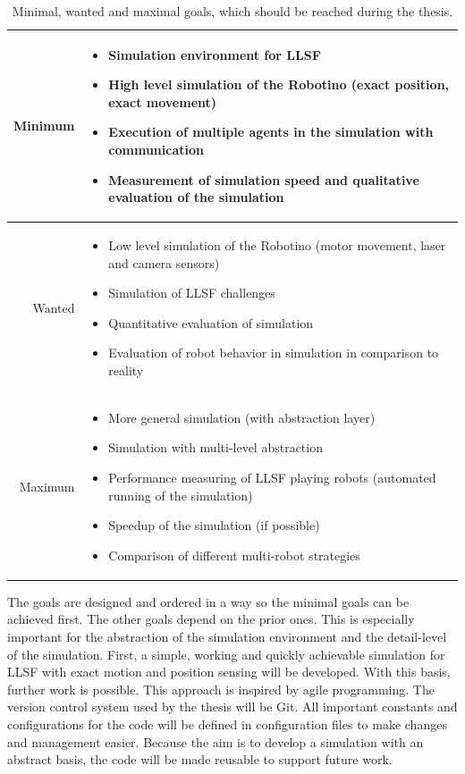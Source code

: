 \documentclass[11pt,a4paper,titlepage]{article}
\begin{document}
\begin{table}
\begin{tabular}{|r||p{10cm}|}
\hline
Minimum & \begin{itemize}
\item Simulation environment for LLSF
\item High level simulation of the Robotino (exact position, exact movement)
\item Execution of multiple agents in the simulation with communication
\item Measurement of simulation speed and qualitative evaluation of the simulation
\end{itemize}\\ \hline
Wanted & \begin{itemize}
\item Low level simulation of the Robotino (motor movement, laser and camera sensors)
\item Simulation of LLSF challenges
\item Quantitative evaluation of simulation
\item Evaluation of robot behavior in simulation in comparison to reality
\end{itemize}\\ \hline
Maximum & \begin{itemize}
\item More general simulation (with abstraction layer)
\item Simulation with multi-level abstraction
\item Performance measuring of LLSF playing robots (automated running of the simulation)
\item Speedup of the simulation (if possible)
\item Comparison of different multi-robot strategies
\end{itemize}\\
\hline
\end{tabular}
\label{Table 1}
\caption{Minimal, wanted and maximal goals, which should be reached during the thesis.}
\end{table}
The goals are designed and ordered in a way so the minimal goals can be achieved first. The other goals depend on the prior ones. This is especially important for the abstraction of the simulation environment and the detail-level of the simulation. First, a simple, working and quickly achievable simulation for LLSF with exact motion and position sensing will be developed. With this basis, further work is possible. This approach is inspired by agile programming. The version control system used by the thesis will be Git. All important constants and configurations for the code will be defined in configuration files to make changes and management easier. Because the aim is to develop a simulation with an abstract basis, the code will be made reusable to support future work.\\
\end{document}
